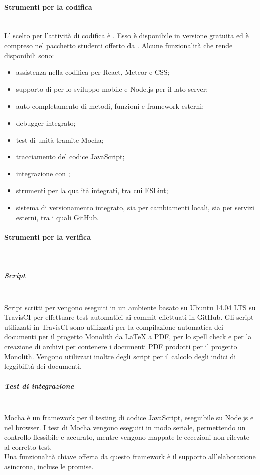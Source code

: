 \paragraph{Strumenti per la codifica}\mbox{}\\
L' scelto per l'attività di codifica è \textbf{}. Esso è disponibile in versione gratuita ed è compreso nel pacchetto studenti offerto da . Alcune funzionalità che rende disponibili sono:
\begin{itemize}
	\item assistenza nella codifica per React, Meteor e CSS;
	\item supporto di  per lo sviluppo mobile e Node.js per il lato server;
	\item auto-completamento di metodi, funzioni e framework esterni;
	\item debugger integrato;
	\item test di unità tramite Mocha;
	\item tracciamento del codice JavaScript;
	\item integrazione con ;
	\item strumenti per la qualità integrati, tra cui ESLint;
	\item sistema di versionamento integrato, sia per cambiamenti locali, sia per servizi esterni, tra i quali GitHub.
\end{itemize}

\paragraph{Strumenti per la verifica}\mbox{}\\
\subparagraph{Script}\mbox{}\\
Script scritti per  vengono eseguiti in un ambiente basato su Ubuntu 14.04 LTS su TravisCI per effettuare test automatici ai commit effettuati in GitHub.
Gli script utilizzati in TravisCI sono utilizzati per la compilazione automatica dei documenti per il progetto Monolith da \LaTeX{} a PDF, per lo spell check e per la creazione di archivi per contenere i documenti PDF prodotti per il progetto Monolith.
Vengono utilizzati inoltre degli script per il calcolo degli indici di leggibilità dei documenti.


\subparagraph{Test di integrazione}\mbox{}
\mbox{}\\
Mocha è un framework per il testing di codice JavaScript, eseguibile su Node.js e nel browser. I test di Mocha vengono eseguiti in modo seriale, permettendo un controllo flessibile e accurato, mentre vengono mappate le eccezioni non rilevate al corretto test.\\
Una funzionalità chiave offerta da questo framework è il supporto all'elaborazione asincrona, incluse le promise.

